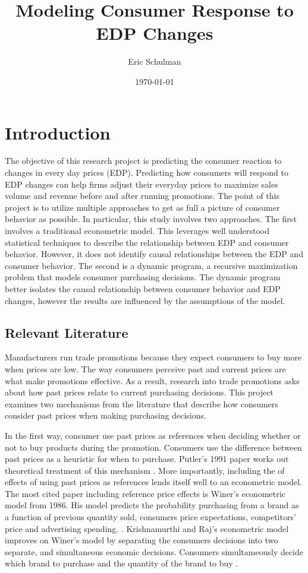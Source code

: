 \documentclass{article}
\title{Modeling Consumer Response to EDP Changes}
\author{Eric Schulman}
\date{\today}
\begin{document}
\maketitle

\section{Introduction}

The objective of this research project is predicting the consumer reaction to changes in every day prices (EDP). Predicting how consumers will respond to EDP changes can help firms adjust their everyday prices to maximize sales volume and revenue before and after running promotions. The point of this project is to utilize multiple approaches to get as full a picture of consumer behavior as possible. In particular, this study involves two approaches. The first involves a traditional econometric model. This leverages well understood statistical techniques to describe the relationship between EDP and consumer behavior. However, it does not identify causal relationships between the EDP and consumer behavior. The second is a dynamic program, a recursive maximization problem that models consumer purchasing decisions. The dynamic program better isolates the causal relationship between consumer behavior and EDP changes, however the results are influenced by the assumptions of the model.

\subsection{Relevant Literature}

Manufacturers run trade promotions because they expect consumers to buy more when prices are low. The way consumers perceive past and current prices are what make promotions effective. As a result, research into trade promotions asks about how past prices relate to current purchasing decisions.  This project examines two mechanisms from the literature that describe how consumers consider past prices when making purchasing decisions.

In the first way, consumer use past prices as references when deciding whether or not to buy products during the promotion. Consumers use the difference between past prices as a heuristic for when to purchase. Putler's 1991 paper works out theoretical treatment of this mechanism \cite{putler}. More importantly, including the of effects of using past prices as references lends itself well to an econometric model. The most cited paper including reference price effects is Winer's econometric model from 1986. His model predicts the probability purchasing from a brand as a function of previous quantity sold, consumers price expectations, competitors' price and advertising spending.  \cite{winer}. Krishnamurthi and Raj's econometric model improves on Winer's model by separating the consumers decisions into two separate, and simultaneous economic decisions. Consumers simultameously decide which  brand to purchase and the quantity of the brand to buy  \cite{krishnamurthi}.
\end{document}
